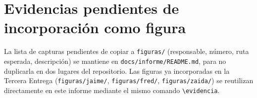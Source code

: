 \section{Evidencias pendientes de incorporaci\'on como figura}

La lista de capturas pendientes de copiar a \texttt{figuras/} (responsable,
n\'umero, ruta esperada, descripci\'on) se mantiene en
\texttt{docs/informe/README.md}, para no duplicarla en dos lugares del
repositorio. Las figuras ya incorporadas en la Tercera Entrega
(\texttt{figuras/jaime/}, \texttt{figuras/fred/}, \texttt{figuras/zaida/})
se reutilizan directamente en este informe mediante el mismo comando
\texttt{\textbackslash evidencia}.
